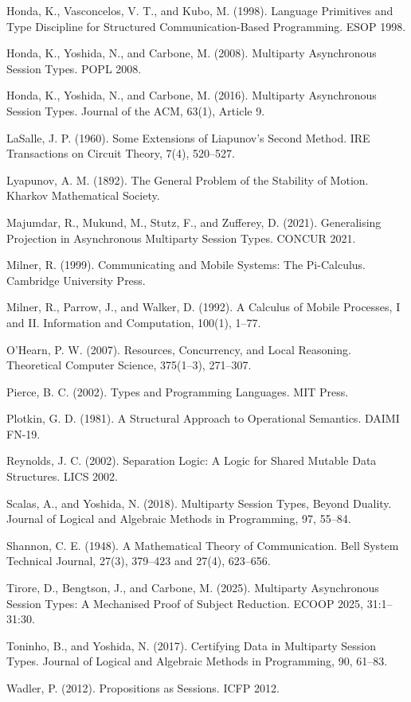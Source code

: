 \documentclass[a4paper,10pt,twocolumn,english]{article}
\numberwithin{equation}{section}
\theoremstyle{paperdef}
\theoremstyle{paperplain}
\theoremstyle{paperdef}
\theoremstyle{paperremark}
\newenvironment{citelist}{%
  \begin{list}{}{%
    \setlength{\leftmargin}{1.25em}%
    \setlength{\itemindent}{-1.25em}%
    \setlength{\itemsep}{2pt}%
    \setlength{\parsep}{0pt}%
    \setlength{\topsep}{3pt}}%
}{\end{list}}
\begin{document}
\begin{citelist}
	\item Honda, K., Vasconcelos, V. T., and Kubo, M. (1998). Language Primitives and Type Discipline for Structured Communication-Based Programming. ESOP 1998.
	\item Honda, K., Yoshida, N., and Carbone, M. (2008). Multiparty Asynchronous Session Types. POPL 2008.
	\item Honda, K., Yoshida, N., and Carbone, M. (2016). Multiparty Asynchronous Session Types. Journal of the ACM, 63(1), Article 9.
	\item LaSalle, J. P. (1960). Some Extensions of Liapunov's Second Method. IRE Transactions on Circuit Theory, 7(4), 520--527.
	\item Lyapunov, A. M. (1892). The General Problem of the Stability of Motion. Kharkov Mathematical Society.
	\item Majumdar, R., Mukund, M., Stutz, F., and Zufferey, D. (2021). Generalising Projection in Asynchronous Multiparty Session Types. CONCUR 2021.
	\item Milner, R. (1999). Communicating and Mobile Systems: The Pi-Calculus. Cambridge University Press.
	\item Milner, R., Parrow, J., and Walker, D. (1992). A Calculus of Mobile Processes, I and II. Information and Computation, 100(1), 1--77.
	\item O'Hearn, P. W. (2007). Resources, Concurrency, and Local Reasoning. Theoretical Computer Science, 375(1--3), 271--307.
	\item Pierce, B. C. (2002). Types and Programming Languages. MIT Press.
	\item Plotkin, G. D. (1981). A Structural Approach to Operational Semantics. DAIMI FN-19.
	\item Reynolds, J. C. (2002). Separation Logic: A Logic for Shared Mutable Data Structures. LICS 2002.
	\item Scalas, A., and Yoshida, N. (2018). Multiparty Session Types, Beyond Duality. Journal of Logical and Algebraic Methods in Programming, 97, 55--84.
	\item Shannon, C. E. (1948). A Mathematical Theory of Communication. Bell System Technical Journal, 27(3), 379--423 and 27(4), 623--656.
	\item Tirore, D., Bengtson, J., and Carbone, M. (2025). Multiparty Asynchronous Session Types: A Mechanised Proof of Subject Reduction. ECOOP 2025, 31:1--31:30.
	\item Toninho, B., and Yoshida, N. (2017). Certifying Data in Multiparty Session Types. Journal of Logical and Algebraic Methods in Programming, 90, 61--83.
	\item Wadler, P. (2012). Propositions as Sessions. ICFP 2012.
\end{citelist}
\end{document}
